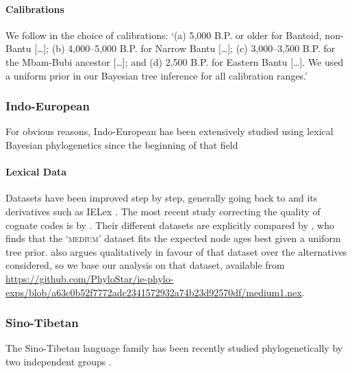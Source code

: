 \documentclass[a4paper,12pt]{scrartcl}
\begin{document}
\paragraph{Calibrations}
We follow \textcite{grollemund2015bantu} in the choice of calibrations: ‘(a) 5,000 B.P. or older for Bantoid, non-Bantu […]; (b) 4,000–5,000 B.P. for Narrow Bantu […]; (c) 3,000–3,500 B.P. for the Mbam-Bubi ancestor […]; and (d) 2,500 B.P. for Eastern Bantu […]. We used a uniform prior in our Bayesian tree inference for all calibration ranges.’

\subsubsection{Indo-European}
For obvious reasons, Indo-European has been extensively studied using lexical Bayesian phylogenetics since the beginning
of that field
\parencite{bouckaert2012mapping,chang-ie,gray2003language,holm2017steppe,rama2018three,willems2016using}
\paragraph{Lexical Data}
Datasets have been improved
step by step, generally going back to \textcite{dyen1992comparative} and its derivatives such as IELex \parencite{ielex}. The most recent study correcting
the quality of cognate codes is by \textcite{chang-ie}. Their different datasets are explicitly compared by \textcite{rama2018three}, who finds that the
‘\textsc{medium}’ dataset fits the expected node ages best given a uniform tree prior.  also argues qualitatively in favour of
that dataset over the alternatives considered, so we base our analysis on that dataset, available from
\url{https://github.com/PhyloStar/ie-phylo-exps/blob/a63c0b52f7772adc2341572932a74b23d92570df/medium1.nex}.

\subsubsection{Sino-Tibetan}
The Sino-Tibetan language family has been recently studied phylogenetically by two independent groups
\parencite{sagart2019dated,zhang2019phylogenetic}.
\end{document}
